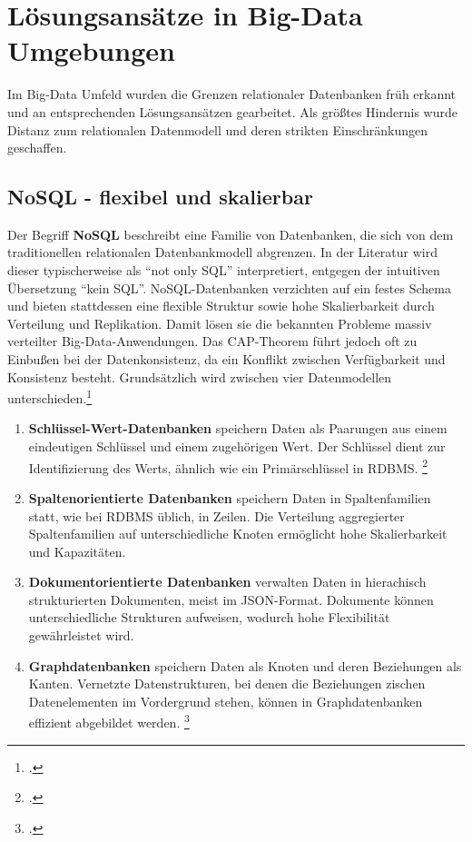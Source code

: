 \section{Lösungsansätze in Big-Data Umgebungen}

Im Big-Data Umfeld wurden die Grenzen relationaler Datenbanken früh erkannt und an entsprechenden Lösungsansätzen gearbeitet. Als größtes Hindernis wurde Distanz zum relationalen Datenmodell und deren strikten Einschränkungen geschaffen.

\subsection{NoSQL - flexibel und skalierbar}

Der Begriff \textbf{NoSQL} beschreibt eine Familie von Datenbanken, die sich von dem traditionellen relationalen Datenbankmodell abgrenzen. In der Literatur wird dieser typischerweise als \enquote{not only SQL} interpretiert, entgegen der intuitiven Übersetzung \enquote{kein SQL}. NoSQL-Datenbanken verzichten auf ein festes Schema und bieten stattdessen eine flexible Struktur sowie hohe Skalierbarkeit durch Verteilung und Replikation. Damit lösen sie die bekannten Probleme massiv verteilter Big-Data-Anwendungen. Das CAP-Theorem führt jedoch oft zu Einbußen bei der Datenkonsistenz, da ein Konflikt zwischen Verfügbarkeit und Konsistenz besteht. Grundsätzlich wird zwischen vier Datenmodellen unterschieden.\footcite[S. 12]{meierWerkzeugeDigitalenWirtschaft2018}

\begin{enumerate}[nosep]
    \item \textbf{Schlüssel-Wert-Datenbanken} speichern Daten als Paarungen aus einem eindeutigen Schlüssel und einem zugehörigen Wert. Der Schlüssel dient zur Identifizierung des Werts, ähnlich wie ein Primärschlüssel in RDBMS. \footcite[S. 2]{wangSQLVsNoSQL2017}
    \item \textbf{Spaltenorientierte Datenbanken} speichern Daten in Spaltenfamilien statt, wie bei RDBMS üblich, in Zeilen. Die Verteilung aggregierter Spaltenfamilien auf unterschiedliche Knoten ermöglicht hohe Skalierbarkeit und Kapazitäten.
    \item \textbf{Dokumentorientierte Datenbanken} verwalten Daten in hierachisch strukturierten Dokumenten, meist im JSON-Format. Dokumente können unterschiedliche Strukturen aufweisen, wodurch hohe Flexibilität gewährleistet wird.
    \item \textbf{Graphdatenbanken} speichern Daten als Knoten und deren Beziehungen als Kanten. Vernetzte Datenstrukturen, bei denen die Beziehungen zischen Datenelementen im Vordergrund stehen, können in Graphdatenbanken effizient abgebildet werden. \footcite[S. 43-46]{meierWerkzeugeDigitalenWirtschaft2018}
\end{enumerate}

